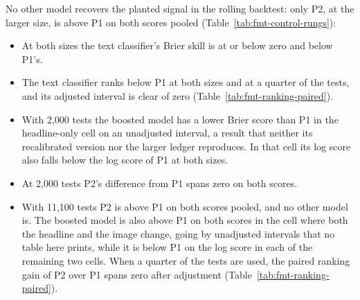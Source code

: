No other model recovers the planted signal in the rolling backtest: only P2, at the larger size, is above P1 on both scores pooled (Table~\ref{tab:fmt-control-rungs}):
\begin{itemize}
\item At both sizes the text classifier's Brier skill is at or below zero and below P1's.
\item The text classifier ranks below P1 at both sizes and at a quarter of the tests, and its adjusted interval is clear of zero (Table~\ref{tab:fmt-ranking-paired}).
\item With 2,000 tests the boosted model has a lower Brier score than P1 in the headline-only cell on an unadjusted interval, a result that neither its recalibrated version nor the larger ledger reproduces. In that cell its log score also falls below the log score of P1 at both sizes.
\item At 2,000 tests P2's difference from P1 spans zero on both scores.
\item With 11,100 tests P2 is above P1 on both scores pooled, and no other model is. The boosted model is also above P1 on both scores in the cell where both the headline and the image change, going by unadjusted intervals that no table here prints, while it is below P1 on the log score in each of the remaining two cells. When a quarter of the tests are used, the paired ranking gain of P2 over P1 spans zero after adjustment (Table~\ref{tab:fmt-ranking-paired}).
\end{itemize}
